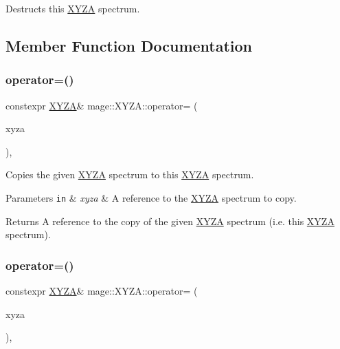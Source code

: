 Destructs this \hyperlink{structmage_1_1_x_y_z_a}{X\+Y\+ZA} spectrum. 

\subsection{Member Function Documentation}
\hypertarget{structmage_1_1_x_y_z_a_a04a66bdc8e61c6b415e1b509f466bf50}{}\label{structmage_1_1_x_y_z_a_a04a66bdc8e61c6b415e1b509f466bf50} 
\subsubsection{\texorpdfstring{operator=()}{operator=()}\hspace{0.1cm}{\footnotesize\ttfamily [1/2]}}
{\footnotesize\ttfamily constexpr \hyperlink{structmage_1_1_x_y_z_a}{X\+Y\+ZA}\& mage\+::\+X\+Y\+Z\+A\+::operator= (\begin{DoxyParamCaption}\item[{const \hyperlink{structmage_1_1_x_y_z_a}{X\+Y\+ZA} \&}]{xyza }\end{DoxyParamCaption})\hspace{0.3cm}{\ttfamily [default]}, {\ttfamily [noexcept]}}

Copies the given \hyperlink{structmage_1_1_x_y_z_a}{X\+Y\+ZA} spectrum to this \hyperlink{structmage_1_1_x_y_z_a}{X\+Y\+ZA} spectrum.


\begin{DoxyParams}[1]{Parameters}
\mbox{\tt in}  & {\em xyza} & A reference to the \hyperlink{structmage_1_1_x_y_z_a}{X\+Y\+ZA} spectrum to copy. \\
\hline
\end{DoxyParams}
\begin{DoxyReturn}{Returns}
A reference to the copy of the given \hyperlink{structmage_1_1_x_y_z_a}{X\+Y\+ZA} spectrum (i.\+e. this \hyperlink{structmage_1_1_x_y_z_a}{X\+Y\+ZA} spectrum). 
\end{DoxyReturn}
\hypertarget{structmage_1_1_x_y_z_a_a15556bcc4521264fc3edfc1b4f1a595a}{}\label{structmage_1_1_x_y_z_a_a15556bcc4521264fc3edfc1b4f1a595a} 
\subsubsection{\texorpdfstring{operator=()}{operator=()}\hspace{0.1cm}{\footnotesize\ttfamily [2/2]}}
{\footnotesize\ttfamily constexpr \hyperlink{structmage_1_1_x_y_z_a}{X\+Y\+ZA}\& mage\+::\+X\+Y\+Z\+A\+::operator= (\begin{DoxyParamCaption}\item[{\hyperlink{structmage_1_1_x_y_z_a}{X\+Y\+ZA} \&\&}]{xyza }\end{DoxyParamCaption})\hspace{0.3cm}{\ttfamily [default]}, {\ttfamily [noexcept]}}

